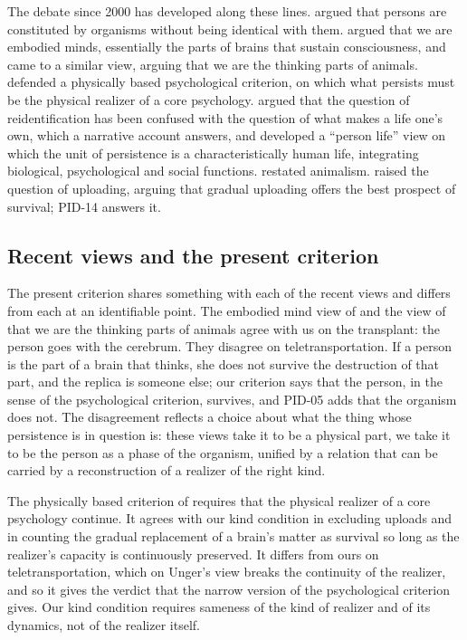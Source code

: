 \documentclass{situationist-preprint}
\begin{document}
The debate since 2000 has developed along these lines. \citet{Baker2000} argued that persons are constituted by organisms without being identical with them. \citet{McMahan2002} argued that we are embodied minds, essentially the parts of brains that sustain consciousness, and \citet{Parfit2012} came to a similar view, arguing that we are the thinking parts of animals. \citet{Unger1990} defended a physically based psychological criterion, on which what persists must be the physical realizer of a core psychology. \citet{Schechtman1996} argued that the question of reidentification has been confused with the question of what makes a life one's own, which a narrative account answers, and \citet{Schechtman2014} developed a \enquote{person life} view on which the unit of persistence is a characteristically human life, integrating biological, psychological and social functions. \citet{Snowdon2014} restated animalism. \citet{Chalmers2010} raised the question of uploading, arguing that gradual uploading offers the best prospect of survival; PID-14 answers it.

\subsection{Recent views and the present criterion}

The present criterion shares something with each of the recent views and differs from each at an identifiable point. The embodied mind view of \citet{McMahan2002} and the view of \citet{Parfit2012} that we are the thinking parts of animals agree with us on the transplant: the person goes with the cerebrum. They disagree on teletransportation. If a person is the part of a brain that thinks, she does not survive the destruction of that part, and the replica is someone else; our criterion says that the person, in the sense of the psychological criterion, survives, and PID-05 adds that the organism does not. The disagreement reflects a choice about what the thing whose persistence is in question is: these views take it to be a physical part, we take it to be the person as a phase of the organism, unified by a relation that can be carried by a reconstruction of a realizer of the right kind.

The physically based criterion of \citet{Unger1990} requires that the physical realizer of a core psychology continue. It agrees with our kind condition in excluding uploads and in counting the gradual replacement of a brain's matter as survival so long as the realizer's capacity is continuously preserved. It differs from ours on teletransportation, which on Unger's view breaks the continuity of the realizer, and so it gives the verdict that the narrow version of the psychological criterion gives. Our kind condition requires sameness of the kind of realizer and of its dynamics, not of the realizer itself.
\end{document}
